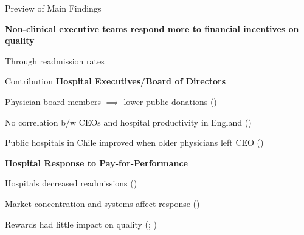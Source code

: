 \documentclass[notes,11pt, aspectratio=169]{beamer}
\newenvironment{wideitemize}{\itemize\addtolength{\itemsep}{10pt}}{\enditemize}
\begin{document}
\begin{frame}{Preview of Main Findings}

\large

\textbf{Non-clinical executive teams respond more to financial incentives on quality}

\vspace{3mm}

\begin{wideitemize}
    \item Through readmission rates
\end{wideitemize}
\end{frame}

\begin{frame}{Contribution}
\large
    \textbf{Hospital Executives/Board of Directors}

\vspace{2mm}
    
    \begin{wideitemize}
        \normalsize \item Physician board members $\implies$ lower public donations \scriptsize (\cite{brickley2010board}) \normalsize
        \normalsize \item No correlation b/w CEOs and hospital productivity in England \scriptsize (\cite{janke2019impact})\normalsize
        \normalsize \item Public hospitals in Chile improved when older physicians left CEO \scriptsize (\cite{munoz2025managers}) \normalsize
    \end{wideitemize}

    \vspace{5mm}\pause

    \textbf{Hospital Response to Pay-for-Performance}

\vspace{2mm}
    
    \begin{wideitemize}
        \normalsize \item Hospitals decreased readmissions \scriptsize (\cite{gupta2021impacts}) 

        \vspace{-.5mm}
        
        \normalsize \item Market concentration and systems affect response 
        \scriptsize (\cite{kunz2024assessing}) 
        
        \normalsize\item Rewards had little impact on quality \scriptsize (\cite{norton2018moneyball}; \cite{friedson2019so})
    \end{wideitemize}
\end{frame}
\end{document}
